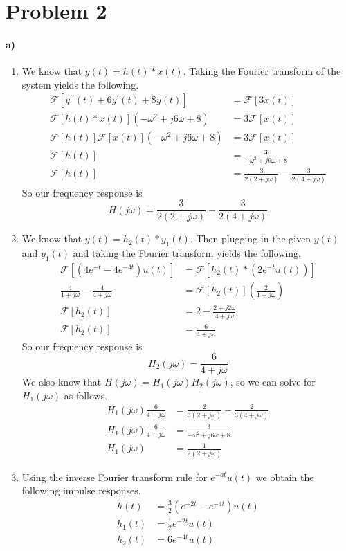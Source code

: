 \documentclass[12pt]{article}
\begin{document}
\section*{Problem 2}

\paragraph{a)}

\begin{enumerate}
    \item We know that \(y(t)=h(t)*x(t)\). Taking the Fourier transform of the system yields the following.
    \begin{align*}
        \mathcal{F}[y^{\prime\prime}(t)+6y^\prime(t)+8y(t)]&=\mathcal{F}[3x(t)]\\
        \mathcal{F}[h(t)*x(t)](-\omega^2+j6\omega+8)&=3\mathcal{F}[x(t)]\\
        \mathcal{F}[h(t)]\mathcal{F}[x(t)](-\omega^2+j6\omega+8)&=3\mathcal{F}[x(t)]\\
        \mathcal{F}[h(t)]&=\frac{3}{-\omega^2+j6\omega+8}\\
        \mathcal{F}[h(t)]&=\frac{3}{2(2+j\omega)}-\frac{3}{2(4+j\omega)}
    \end{align*}
    So our frequency response is
    \[H(j\omega)=\frac{3}{2(2+j\omega)}-\frac{3}{2(4+j\omega)}\]
    \item We know that \(y(t)=h_2(t)*y_1(t)\). Then plugging in the given \(y(t)\) and \(y_1(t)\) and taking the Fourier transform yields the following.
    \begin{align*}
        \mathcal{F}[(4e^{-t}-4e^{-4t})u(t)]&=\mathcal{F}[h_2(t)*(2e^{-t}u(t))]\\
        \frac{4}{1+j\omega}-\frac{4}{4+j\omega}&=\mathcal{F}[h_2(t)]\left(\frac{2}{1+j\omega}\right)\\
        \mathcal{F}[h_2(t)]&=2-\frac{2+j2\omega}{4+j\omega}\\
        \mathcal{F}[h_2(t)]&=\frac{6}{4+j\omega}
    \end{align*}
    So our frequency response is
    \[H_2(j\omega)=\frac{6}{4+j\omega}\]
    We also know that \(H(j\omega)=H_1(j\omega)H_2(j\omega)\), so we can solve for \(H_1(j\omega)\) as follows.
    \begin{align*}
        H_1(j\omega)\frac{6}{4+j\omega}&=\frac{2}{3(2+j\omega)}-\frac{2}{3(4+j\omega)}\\
        H_1(j\omega)\frac{6}{4+j\omega}&=\frac{3}{-\omega^2+j6\omega+8}\\
        H_1(j\omega)&=\frac{1}{2(2+j\omega)}
    \end{align*}
    \item Using the inverse Fourier transform rule for \(e^{-at}u(t)\) we obtain the following impulse responses.
    \begin{align*}
        h(t)&=\frac{3}{2}(e^{-2t}-e^{-4t})u(t)\\
        h_1(t)&=\frac{1}{2}e^{-2t}u(t)\\
        h_2(t)&=6e^{-4t}u(t)
    \end{align*}
\end{enumerate}
\end{document}
